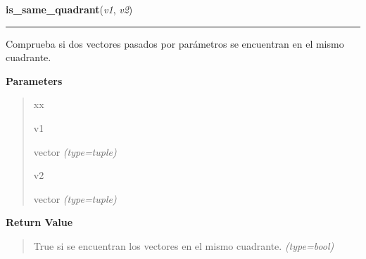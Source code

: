 \hspace{.8\funcindent}\begin{boxedminipage}{\funcwidth}

    \raggedright \textbf{is\_same\_quadrant}(\textit{v1}, \textit{v2})

    \vspace{-1.5ex}

    \rule{\textwidth}{0.5\fboxrule}
\setlength{\parskip}{2ex}
Comprueba si dos vectores pasados por parámetros se encuentran en el mismo cuadrante.

\setlength{\parskip}{1ex}
      \textbf{Parameters}
      \vspace{-1ex}

      \begin{quote}
        \begin{Ventry}{xx}

          \item[v1]


vector
            {\it (type=tuple)}

          \item[v2]


vector
            {\it (type=tuple)}

        \end{Ventry}

      \end{quote}

      \textbf{Return Value}
    \vspace{-1ex}

      \begin{quote}

True si se encuentran los vectores en el mismo cuadrante.
      {\it (type=bool)}

      \end{quote}

    \end{boxedminipage}

    \label{src:check_goban_moved:degress_between_two_vectors}

    \vspace{0.5ex}

